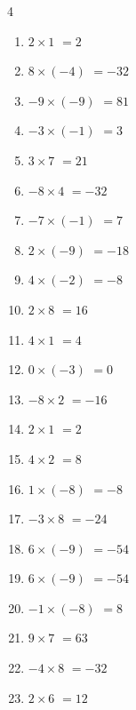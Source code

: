 \begin{multicols}{4}
\begin{enumerate}
  \item $2\times 1$
        $=2$

  \item $8\times (-4)$
        $=-32$

  \item $-9\times (-9)$
        $=81$

  \item $-3\times (-1)$
        $=3$

  \item $3\times 7$
        $=21$

  \item $-8\times 4$
        $=-32$

  \item $-7\times (-1)$
        $=7$

  \item $2\times (-9)$
        $=-18$

  \item $4\times (-2)$
        $=-8$

  \item $2\times 8$
        $=16$

  \item $4\times 1$
        $=4$

  \item $0\times (-3)$
        $=0$

  \item $-8\times 2$
        $=-16$

  \item $2\times 1$
        $=2$

  \item $4\times 2$
        $=8$

  \item $1\times (-8)$
        $=-8$

  \item $-3\times 8$
        $=-24$

  \item $6\times (-9)$
        $=-54$

  \item $6\times (-9)$
        $=-54$

  \item $-1\times (-8)$
        $=8$

  \item $9\times 7$
        $=63$

  \item $-4\times 8$
        $=-32$

  \item $2\times 6$
        $=12$


\end{enumerate}
\end{multicols}
